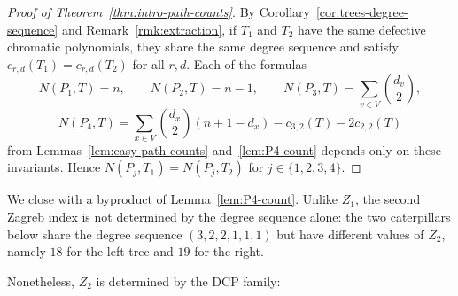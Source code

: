 \documentclass[12pt,reqno]{amsart}
\theoremstyle{definition}
\begin{document}
\begin{proof}[Proof of Theorem~\ref{thm:intro-path-counts}]
By Corollary~\ref{cor:trees-degree-sequence} and Remark~\ref{rmk:extraction}, if $T_1$ and $T_2$ have the same defective chromatic polynomials, they share the same degree sequence and satisfy $c_{r,d}(T_1)=c_{r,d}(T_2)$ for all $r,d$. Each of the formulas
\[
N(P_1, T) = n, \qquad N(P_2, T)=n-1, \qquad N(P_3, T)=\sum_{v\in V}\binom{d_v}{2},
\]
\[
N(P_4, T) = \sum_{x\in V}\binom{d_x}{2}(n+1-d_x) - c_{3,2}(T) - 2c_{2,2}(T)
\]
from Lemmas~\ref{lem:easy-path-counts} and~\ref{lem:P4-count} depends only on these invariants. Hence $N(P_j,T_1)=N(P_j,T_2)$ for $j\in\{1,2,3,4\}$.
\end{proof}

We close with a byproduct of Lemma~\ref{lem:P4-count}. Unlike $Z_1$, the second Zagreb index is not determined by the degree sequence alone: the two caterpillars below share the degree sequence $(3,2,2,1,1,1)$ but have different values of $Z_2$, namely $18$ for the left tree and $19$ for the right.

\begin{center}
\end{center}

Nonetheless, $Z_2$ is determined by the DCP family:
\end{document}
